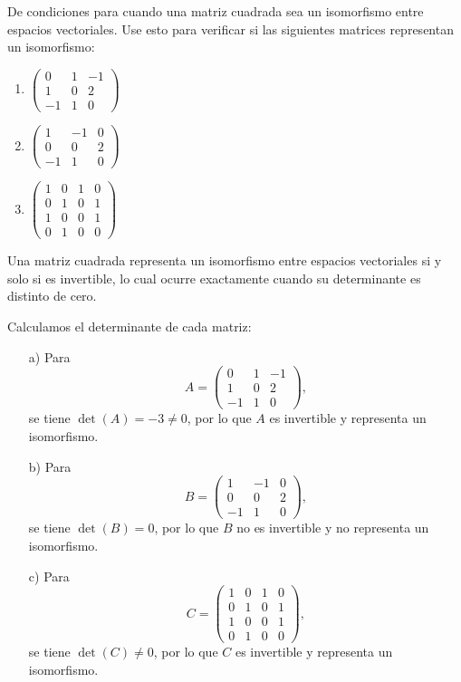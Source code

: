 \begin{prob}
De condiciones para cuando una matriz cuadrada sea un isomorfismo entre espacios vectoriales. Use esto para verificar si las siguientes matrices representan un isomorfismo:
\begin{enumerate}[$a)$]
\item $\begin{pmatrix} 0 & 1 & -1 \\ 1 & 0 & 2 \\ -1 & 1 & 0 \end{pmatrix}$
\item $\begin{pmatrix} 1 & -1 & 0 \\ 0 & 0 & 2 \\ -1 & 1 & 0 \end{pmatrix}$
\item $\begin{pmatrix} 1 & 0 & 1 & 0 \\ 0 & 1 & 0 & 1 \\ 1 & 0 & 0 & 1 \\ 0 & 1 & 0 & 0 \end{pmatrix}$
\end{enumerate}
\begin{myproof}
Una matriz cuadrada representa un isomorfismo entre espacios vectoriales si y solo si es invertible, lo cual ocurre exactamente cuando su determinante es distinto de cero.

Calculamos el determinante de cada matriz:

\begin{itemize}
    \item[a)] Para 
    \[
    A = \begin{pmatrix} 0 & 1 & -1 \\ 1 & 0 & 2 \\ -1 & 1 & 0 \end{pmatrix},
    \]
    se tiene $\det(A) = -3 \neq 0$, por lo que $A$ es invertible y representa un isomorfismo.

    \item[b)] Para 
    \[
    B = \begin{pmatrix} 1 & -1 & 0 \\ 0 & 0 & 2 \\ -1 & 1 & 0 \end{pmatrix},
    \]
    se tiene $\det(B) = 0$, por lo que $B$ no es invertible y no representa un isomorfismo.

    \item[c)] Para 
    \[
    C = \begin{pmatrix} 1 & 0 & 1 & 0 \\ 0 & 1 & 0 & 1 \\ 1 & 0 & 0 & 1 \\ 0 & 1 & 0 & 0 \end{pmatrix},
    \]
    se tiene $\det(C) \neq 0$, por lo que $C$ es invertible y representa un isomorfismo.
\end{itemize}
\end{myproof}
\end{prob}


